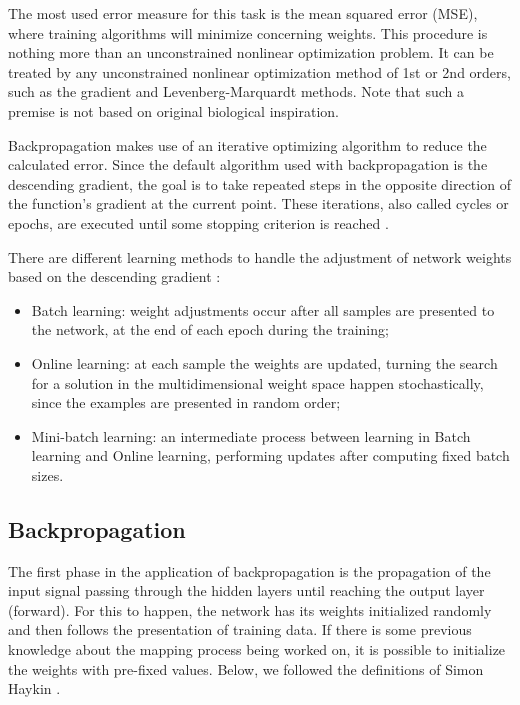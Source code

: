 The most used error measure for this task is the mean squared error (MSE), %
where training algorithms will minimize concerning weights. This procedure is nothing more than an unconstrained nonlinear optimization problem. It can be treated %
by any unconstrained nonlinear optimization method of 1st or 2nd orders, such as the gradient and Levenberg-Marquardt methods. Note that such a premise is not based on original biological inspiration.

Backpropagation makes use of an iterative optimizing algorithm to reduce the calculated error. Since the default algorithm used with backpropagation is the descending gradient, the goal is to take repeated steps in the opposite direction of the function's gradient at the current point. These iterations, also called cycles or epochs, are executed until some stopping criterion is reached \cite{Castro2006FundamentalsON}.

There are different learning methods to handle the adjustment of network weights based on the descending gradient \cite{haykin, Bengio2012}:

\begin{itemize}
	\item Batch learning: weight adjustments occur after all samples are presented to the network, at the end of each epoch during the training;  %
	\item Online learning: at each sample the weights are updated, turning the search for a solution in the multidimensional weight space happen stochastically, since the examples are presented in random order;
	\item Mini-batch learning: an intermediate process between learning in Batch learning and Online learning, performing updates after computing fixed batch sizes.
\end{itemize}


\subsection{Backpropagation}
\label{ssec:Pseudocodigo}

The first phase in the application of backpropagation is the propagation of the input signal passing through the hidden layers until reaching the output layer (forward). For this to happen, the network has its weights initialized randomly and then follows the presentation of training data. If there is some previous knowledge about the mapping process being worked on, it is possible to initialize the weights with pre-fixed values. Below, we followed the definitions of Simon Haykin \cite{haykin}.


